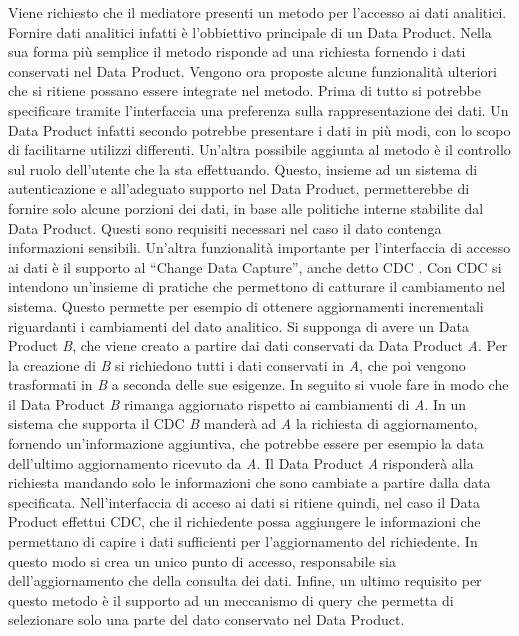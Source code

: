 \documentclass[12pt]{report}
\begin{document}
Viene richiesto che il mediatore presenti un metodo per l'accesso ai dati analitici.
Fornire dati analitici infatti è l'obbiettivo principale di un Data Product.
Nella sua forma più semplice il metodo risponde ad una richiesta fornendo i dati conservati nel Data Product.
Vengono ora proposte alcune funzionalità ulteriori che si ritiene possano essere integrate nel metodo.
Prima di tutto si potrebbe specificare tramite l'interfaccia una preferenza sulla rappresentazione dei dati. 
Un Data Product infatti secondo \cite{zhamak_dehgani_data_2023} potrebbe presentare i dati in più modi, con lo scopo di facilitarne utilizzi differenti.
Un'altra possibile aggiunta al metodo è il controllo sul ruolo dell'utente che la sta effettuando. 
Questo, insieme ad un sistema di autenticazione e all'adeguato supporto nel Data Product, permetterebbe di fornire solo alcune porzioni dei dati, in base alle politiche interne stabilite dal Data Product.
Questi sono requisiti necessari nel caso il dato contenga informazioni sensibili.
Un'altra funzionalità importante per l'interfaccia di accesso ai dati è il supporto al ``Change Data Capture'', anche detto CDC \cite{eventSourcing,petrie2018streaming}.
Con CDC si intendono un'insieme di pratiche che permettono di catturare il cambiamento nel sistema.
Questo permette per esempio di ottenere aggiornamenti incrementali riguardanti i cambiamenti del dato analitico.
Si supponga di avere un Data Product \textit{B}, che viene creato a partire dai dati conservati da Data Product \textit{A}. 
Per la creazione di \textit{B} si richiedono tutti i dati conservati in \textit{A}, che poi vengono trasformati in \textit{B} a seconda delle sue esigenze.
In seguito si vuole fare in modo che il Data Product \textit{B} rimanga aggiornato rispetto ai cambiamenti di \textit{A}.
In un sistema che supporta il CDC \textit{B} manderà ad \textit{A} la richiesta di aggiornamento, fornendo un'informazione aggiuntiva, che potrebbe essere per esempio la data dell'ultimo aggiornamento ricevuto da \textit{A}.
Il Data Product \textit{A} risponderà alla richiesta mandando solo le informazioni che sono cambiate a partire dalla data specificata.
Nell'interfaccia di acceso ai dati si ritiene quindi, nel caso il Data Product effettui CDC, che il richiedente possa aggiungere le informazioni che permettano di capire i dati sufficienti per l'aggiornamento del richiedente.
In questo modo si crea un unico punto di accesso, responsabile sia dell'aggiornamento che della consulta dei dati.
Infine, un ultimo requisito per questo metodo è il supporto ad un meccanismo di query che permetta di selezionare solo una parte del dato conservato nel Data Product.
\end{document}
